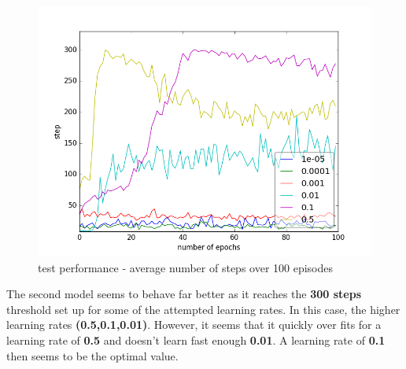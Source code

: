 \documentclass{report}
\begin{document}
\begin{figure}[H]
\centering
\includegraphics[width = \linewidth]{plots/a3-2/step.png}
\caption{test performance - average number of steps over 100 episodes }
\end{figure}


The second model seems to behave far better as it reaches the \textbf{300 steps} threshold set up for some of the attempted learning rates. In this case, the higher learning rates \textbf{(0.5,0.1,0.01)}. However, it seems that it quickly over fits for a learning rate of \textbf{0.5} and doesn't learn fast enough \textbf{0.01}. A learning rate of \textbf{0.1} then seems to be the optimal value.
\end{document}
